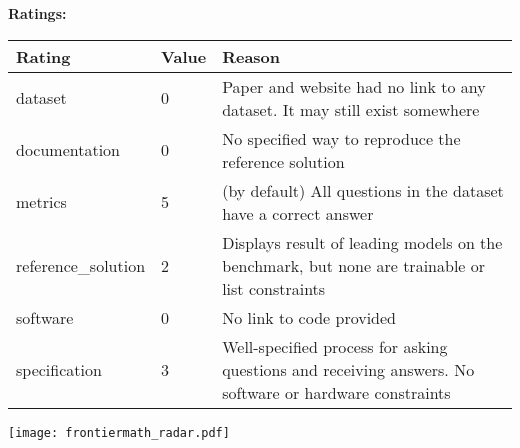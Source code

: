 {{{\bf Ratings:} ~ \\

\begin{tabular}{p{} p{} p{}}
\hline
Rating & Value & Reason \\
\hline
dataset & 0 & Paper and website had no link to any dataset. It may still exist somewhere
 \\
documentation & 0 & No specified way to reproduce the reference solution
 \\
metrics & 5 & (by default) All questions in the dataset have a correct answer
 \\
reference\_solution & 2 & Displays result of leading models on the benchmark, but none are trainable or list constraints
 \\
software & 0 & No link to code provided
 \\
specification & 3 & Well-specified process for asking questions and receiving answers. No software or hardware constraints
 \\
\hline
\end{tabular}

\texttt{[image: frontiermath\_radar.pdf]}
}}
\clearpage
